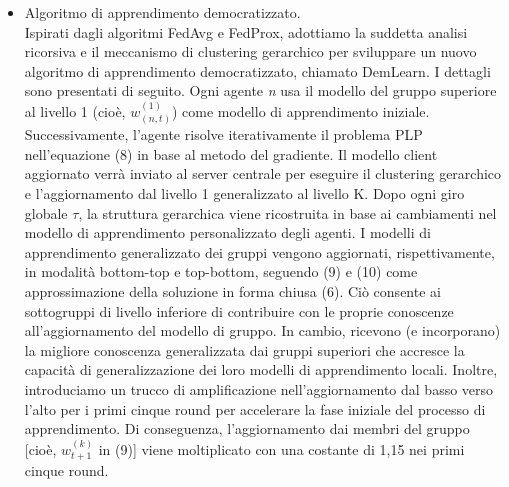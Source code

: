 \begin{itemize}
\item Algoritmo di apprendimento democratizzato.\\
Ispirati dagli algoritmi FedAvg e FedProx, adottiamo la
suddetta analisi ricorsiva e il meccanismo di clustering gerarchico per sviluppare un nuovo algoritmo di apprendimento democratizzato, chiamato DemLearn. I dettagli sono presentati di seguito. Ogni agente \textsl{n} usa il modello del gruppo superiore al livello 1 (cioè, $w_{(n,t)}^{(1)}$) come modello di apprendimento iniziale. Successivamente, l'agente risolve iterativamente il problema PLP nell'equazione (8) in base al metodo del gradiente.
Il modello client aggiornato verrà inviato al server centrale per eseguire il clustering gerarchico e l'aggiornamento dal livello 1 generalizzato al livello K. Dopo ogni giro globale $\tau$, la struttura gerarchica viene ricostruita in base ai cambiamenti nel modello di apprendimento personalizzato degli agenti. I modelli di apprendimento generalizzato dei gruppi vengono aggiornati, rispettivamente, in modalità bottom-top e top-bottom, seguendo (9) e (10) come approssimazione della soluzione in forma chiusa (6). Ciò consente ai sottogruppi di livello inferiore di contribuire con le proprie conoscenze all'aggiornamento del modello di gruppo. In cambio, ricevono (e incorporano) la migliore conoscenza generalizzata dai gruppi superiori che accresce la capacità di generalizzazione dei loro modelli di apprendimento locali. Inoltre, introduciamo un trucco di amplificazione nell'aggiornamento dal basso verso l'alto per i primi cinque round per accelerare la fase iniziale del processo di apprendimento. Di conseguenza, l'aggiornamento dai membri del gruppo [cioè, $w_{t+1}^{(k)}$ in (9)] viene moltiplicato con una costante di 1,15 nei primi cinque round.\\\\
\end{itemize}


